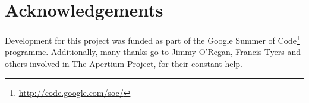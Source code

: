 \documentclass[11pt]{article}
\begin{document}
\section*{Acknowledgements}

Development for this project was funded as part of the Google Summer of Code\footnote{\url{http://code.google.com/soc/}} programme. 
Additionally, many thanks go to Jimmy O'Regan, Francis Tyers and others involved in The Apertium Project, for their constant help.




\end{document}
